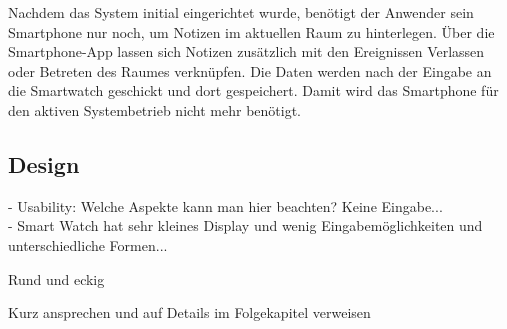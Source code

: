 Nachdem das System initial eingerichtet wurde, benötigt der Anwender sein Smartphone nur noch, um Notizen im aktuellen Raum zu hinterlegen. Über die Smartphone-App lassen sich Notizen zusätzlich mit den Ereignissen Verlassen oder Betreten des Raumes verknüpfen. Die Daten werden nach der Eingabe an die Smartwatch geschickt und dort gespeichert. Damit wird das Smartphone für den aktiven Systembetrieb nicht mehr benötigt.

\subsection{Design}

- Usability: Welche Aspekte kann man hier beachten? Keine Eingabe...
\\- Smart Watch hat sehr kleines Display und wenig Eingabemöglichkeiten und unterschiedliche Formen...

Rund und eckig

Kurz ansprechen und auf Details im Folgekapitel verweisen